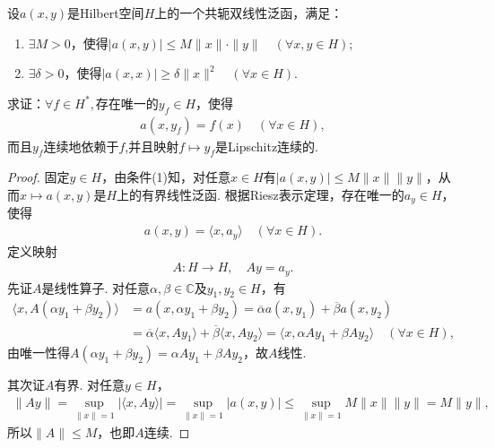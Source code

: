 \documentclass[../../main.tex]{subfiles}%
\begin{document}
\begin{proposition}\label{proposition:共轭双线性型的Riesz表示定理}
设$a(x,y)$是Hilbert空间$H$上的一个共轭双线性泛函，满足：
\begin{enumerate}[(1)]
\item $\exists M>0$，使得$|a(x,y)|\leqslant M\|x\|\cdot\|y\|\quad (\forall x,y\in H)$;
\item $\exists\delta>0$，使得$|a(x,x)|\geqslant\delta\|x\|^2\quad (\forall x\in H)$.
\end{enumerate}
求证：$\forall f\in H^*,$存在唯一的$y_f\in H$，使得
\begin{align*}
a(x,y_f)=f(x)\quad (\forall x\in H),
\end{align*}
而且$y_f$连续地依赖于$f$,并且映射$f\mapsto y_f$是Lipschitz连续的.
\end{proposition}
\begin{proof}

固定$y\in H$，由条件(1)知，对任意$x\in H$有$|a(x,y)|\leqslant M\|x\|\|y\|$，从而$x\mapsto a(x,y)$是$H$上的有界线性泛函. 根据Riesz表示定理，存在唯一的$a_y\in H$，使得
\begin{align*}
a(x,y)=\langle x, a_y\rangle \quad (\forall x\in H).
\end{align*}
定义映射
\begin{align*}
A:H\to H,\quad Ay= a_y.
\end{align*}
先证$A$是线性算子. 对任意$\alpha,\beta\in\mathbb{C}$及$y_1,y_2\in H$，有
\begin{align*}
\langle x, A(\alpha y_1+\beta y_2)\rangle &= a(x,\alpha y_1+\beta y_2) = \overline{\alpha}a(x,y_1)+\overline{\beta}a(x,y_2) \\
&= \overline{\alpha}\langle x, Ay_1\rangle+\overline{\beta}\langle x, Ay_2\rangle = \langle x, \alpha Ay_1+\beta Ay_2\rangle \quad (\forall x\in H),
\end{align*}
由唯一性得$A(\alpha y_1+\beta y_2)=\alpha Ay_1+\beta Ay_2$，故$A$线性.

其次证$A$有界. 对任意$y\in H$，
\begin{align*}
\|Ay\| = \sup_{\|x\|=1}|\langle x, Ay\rangle| = \sup_{\|x\|=1}|a(x,y)| \leqslant \sup_{\|x\|=1} M\|x\|\|y\| = M\|y\|,
\end{align*}
所以$\|A\|\leqslant M$，也即$A$连续.


\end{proof}
\end{document}
